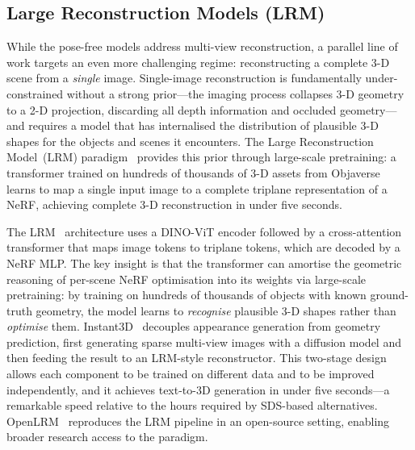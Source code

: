 \subsection{Large Reconstruction Models (LRM)}
\label{sec:lrm}

While the pose-free models address multi-view reconstruction, a parallel
line of work targets an even more challenging regime: reconstructing a
complete 3-D scene from a \emph{single} image.
Single-image reconstruction is fundamentally under-constrained without a
strong prior---the imaging process collapses 3-D geometry to a 2-D projection,
discarding all depth information and occluded geometry---and requires a
model that has internalised the distribution of plausible 3-D shapes for the
objects and scenes it encounters.
The Large Reconstruction Model~(LRM) paradigm~\citep{hong2023lrm} provides this
prior through large-scale pretraining: a transformer trained on hundreds of
thousands of 3-D assets from Objaverse~\citep{deitke2023objaverse} learns
to map a single input image to a complete triplane representation of a NeRF,
achieving complete 3-D reconstruction in under five seconds.

The LRM~\citep{hong2023lrm} architecture uses a DINO-ViT encoder followed by
a cross-attention transformer that maps image tokens to triplane tokens,
which are decoded by a NeRF MLP.
The key insight is that the transformer can amortise the geometric reasoning
of per-scene NeRF optimisation into its weights via large-scale pretraining:
by training on hundreds of thousands of objects with known ground-truth geometry,
the model learns to \emph{recognise} plausible 3-D shapes rather than
\emph{optimise} them.
Instant3D~\citep{li2023instant3d} decouples appearance generation from geometry
prediction, first generating sparse multi-view images with a diffusion model
and then feeding the result to an LRM-style reconstructor.
This two-stage design allows each component to be trained on different data
and to be improved independently, and it achieves text-to-3D generation
in under five seconds---a remarkable speed relative to the hours required by
SDS-based alternatives.
OpenLRM~\citep{openlrm2023} reproduces the LRM pipeline in an open-source
setting, enabling broader research access to the paradigm.

